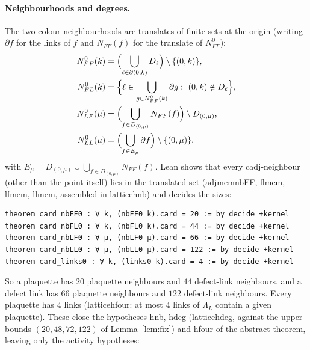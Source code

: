 \documentclass[11pt,a4paper]{article}
\theoremstyle{definition}
\theoremstyle{remark}
\DeclareRobustCommand{\lean}[1]{{\ttfamily\renewcommand{\_}{\textunderscore\allowbreak}#1}}
\newenvironment{leanquote}{\par\smallskip\footnotesize}{\par\smallskip}
\begin{document}
\paragraph{Neighbourhoods and degrees.} The two-colour neighbourhoods are translates of finite sets at the origin (writing $\partial f$ for the links of $f$ and $N_{FF}(f)$ for the translate of $N_{FF}^0$):
\begin{align*}
N_{FF}^0(k)&=\Bigl(\bigcup_{\ell\in\partial(0,k)}D_\ell\Bigr)\setminus\{(0,k)\},\\
N_{FL}^0(k)&=\Bigl\{\ell\in\bigcup_{g\in N_{FF}^0(k)}\partial g:\ (0,k)\notin D_\ell\Bigr\},\\
N_{LF}^0(\mu)&=\Bigl(\bigcup_{f\in D_{(0,\mu)}}N_{FF}(f)\Bigr)\setminus D_{(0,\mu)},\\
N_{LL}^0(\mu)&=\Bigl(\bigcup_{f\in E_\mu}\partial f\Bigr)\setminus\{(0,\mu)\},
\end{align*}
with $E_\mu=D_{(0,\mu)}\cup\bigcup_{f\in D_{(0,\mu)}}N_{FF}(f)$.
Lean shows that every \lean{cadj}-neighbour (other than the point itself) lies in the translated set (\lean{adj\_mem\_nbFF}, \lean{fl\_mem}, \lean{lf\_mem}, \lean{ll\_mem}, assembled in \lean{lattice\_hnb}) and decides the sizes:
\begin{leanquote}
\begin{verbatim}
theorem card_nbFF0 : ∀ k, (nbFF0 k).card = 20 := by decide +kernel
theorem card_nbFL0 : ∀ k, (nbFL0 k).card = 44 := by decide +kernel
theorem card_nbLF0 : ∀ μ, (nbLF0 μ).card = 66 := by decide +kernel
theorem card_nbLL0 : ∀ μ, (nbLL0 μ).card = 122 := by decide +kernel
theorem card_links0 : ∀ k, (links0 k).card = 4 := by decide +kernel
\end{verbatim}
\end{leanquote}
So a plaquette has $20$ plaquette neighbours and $44$ defect-link neighbours, and a defect link has $66$ plaquette neighbours and $122$ defect-link neighbours. Every plaquette has $4$ links (\lean{lattice\_hfour}: at most $4$ links of $\Lambda_L$ contain a given plaquette). These close the hypotheses \lean{hnb}, \lean{hdeg} (\lean{lattice\_hdeg}, against the upper bounds $(20,48,72,122)$ of Lemma~\ref{lem:fix}) and \lean{hfour} of the abstract theorem, leaving only the activity hypotheses:
\end{document}
